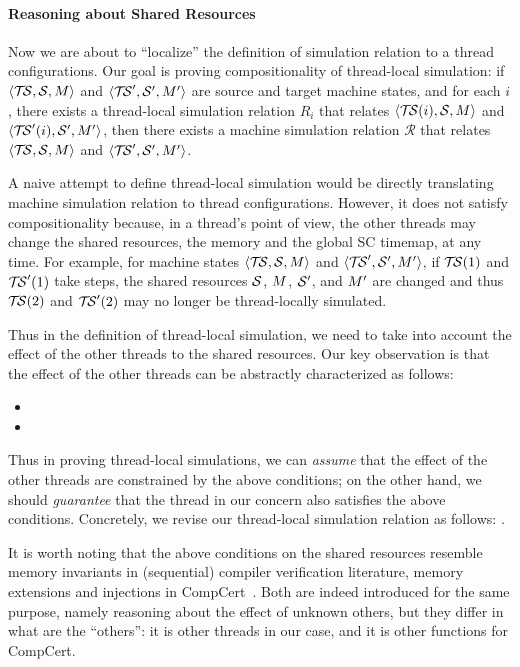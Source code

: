 \paragraph{Reasoning about Shared Resources}

Now we are about to ``localize'' the definition of simulation relation to a thread configurations.
Our goal is proving compositionality of thread-local simulation: if ${\langle{\mathcal{T\!S},{\cal S},M}\rangle}$ and
${\langle{\mathcal{T\!S}',{\cal S}',M'}\rangle}$ are source and target machine states, and for each $i$, there exists a
thread-local simulation relation $R_i$ that relates ${\langle{\mathcal{T\!S}(i),{\cal S},M}\rangle}$ and
${\langle{\mathcal{T\!S}'(i),{\cal S}',M'}\rangle}$, then there exists a machine simulation relation $\mathcal{R}$ that
relates ${\langle{\mathcal{T\!S},{\cal S},M}\rangle}$ and ${\langle{\mathcal{T\!S}',{\cal S}',M'}\rangle}$.

A naive attempt to define thread-local simulation would be directly translating machine simulation
relation to thread configurations.  However, it does not satisfy compositionality because, in a
thread's point of view, the other threads may change the shared resources, \ie{} the memory and the
global SC timemap, at any time.  For example, for machine states ${\langle{\mathcal{T\!S},{\cal S},M}\rangle}$ and
${\langle{\mathcal{T\!S}',{\cal S}',M'}\rangle}$, if $\mathcal{T\!S}(1)$ and $\mathcal{T\!S}'(1)$ take steps, the shared resources ${\cal S}$,
$M$, ${\cal S}'$, and $M'$ are changed and thus $\mathcal{T\!S}(2)$ and $\mathcal{T\!S}'(2)$ may no longer be
thread-locally simulated.

Thus in the definition of thread-local simulation, we need to take into account the effect of the
other threads to the shared resources.  Our key observation is that the effect of the other threads
can be abstractly characterized as follows:
\begin{itemize}
\item {}
\item {}
\end{itemize}
%
\noindent Thus in proving thread-local simulations, we can \emph{assume} that the effect of the
other threads are constrained by the above conditions; on the other hand, we should \emph{guarantee}
that the thread in our concern also satisfies the above conditions.  Concretely, we revise our
thread-local simulation relation as follows: .

It is worth noting that the above conditions on the shared resources resemble memory invariants in
(sequential) compiler verification literature, \eg{} memory extensions and injections in
CompCert~\cite{Leroy-Appel-Blazy-Stewart-memory-v2}.  Both are indeed introduced for the same
purpose, namely reasoning about the effect of unknown others, but they differ in what are the
``others'': it is other threads in our case, and it is other functions for \eg{} CompCert.



